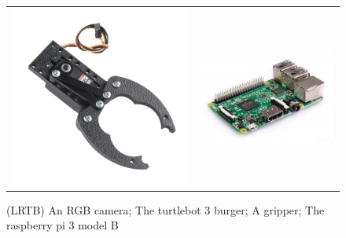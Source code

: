 \documentclass{beamer}
\begin{document}
\begin{frame}[t,fragile]
\begin{columns}[T,totalwidth=\textwidth]
\begin{column}{.48\textwidth}
\begin{figure}
\begin{tabular}{cc}
	        \includegraphics[scale = 0.5]{graphics/claw.jpg}  & \includegraphics[scale = 0.3]{graphics/rpi.jpg}
	    \end{tabular}
	    \label{fig:fotos}
	    \caption{(LRTB) An RGB camera; The turtlebot 3 burger; A gripper; The raspberry pi 3 model B}
	\end{figure}

	
	
	\end{column}








\end{columns}
\end{frame}
\end{document}
